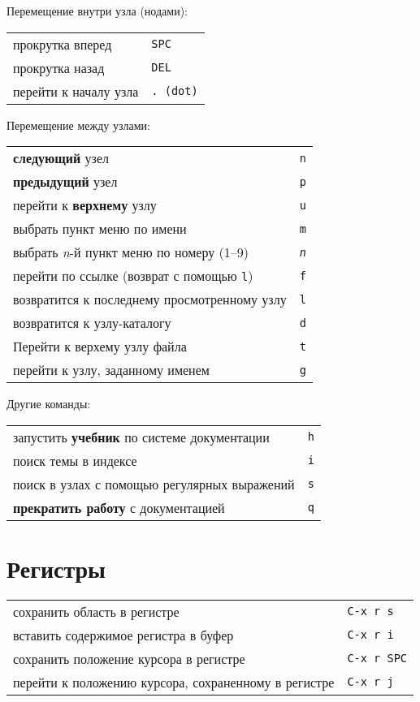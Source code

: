 \documentclass[10pt]{article}
\newlength{\ColWidth}
\newcommand{\kbd}[1]{\texttt{#1}}
\begin{document}
Перемещение внутри узла (нодами):

\begin{tabular}{p{\ColWidth}l}
прокрутка вперед & \kbd{SPC} \\
прокрутка назад & \kbd{DEL} \\
перейти к началу узла & \kbd{. {\rm (dot)}} \\
\end{tabular}

Перемещение между узлами:

\begin{tabular}{p{\ColWidth}l}
{\bf следующий} узел & \kbd{n} \\
{\bf предыдущий} узел & \kbd{p} \\
перейти к {\bf верхнему} узлу & \kbd{u} \\
выбрать пункт меню по имени & \kbd{m} \\
выбрать {\it n\/}-й пункт меню по номеру (1--9) & \kbd{{\it n}} \\
перейти по ссылке (возврат с помощью \kbd{l}) & \kbd{f} \\
возвратится к последнему просмотренному узлу & \kbd{l} \\
возвратится к узлу-каталогу & \kbd{d} \\
Перейти к верхему узлу файла & \kbd{t} \\
перейти к узлу, заданному именем & \kbd{g} \\
\end{tabular}

Другие команды:

\begin{tabular}{p{\ColWidth}l}
запустить {\bf учебник} по системе документации & \kbd{h} \\
поиск темы в индексе & \kbd{i} \\
поиск в узлах с помощью регулярных выражений & \kbd{s} \\
{\bf прекратить работу} с документацией & \kbd{q} \\
\end{tabular}

\section{Регистры}

\begin{tabular}{p{\ColWidth}l}
сохранить область в регистре & \kbd{C-x r s} \\
вставить содержимое регистра в буфер & \kbd{C-x r i} \\

сохранить положение курсора в регистре & \kbd{C-x r SPC} \\
перейти к положению курсора, сохраненному в регистре & \kbd{C-x r j} \\
\end{tabular}
\end{document}
